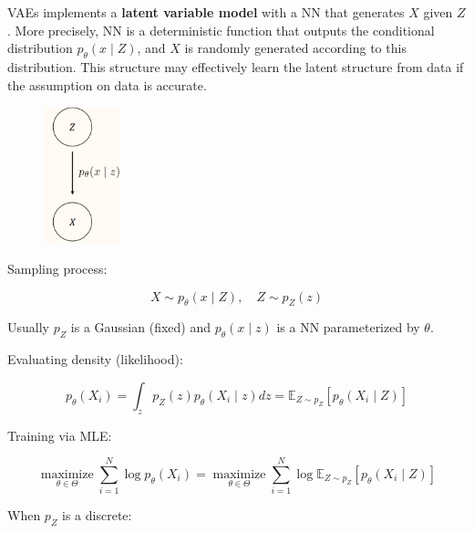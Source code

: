 \documentclass{report}
\begin{document}
\begin{definition}
    VAEs implements a \textbf{latent variable model} with a NN that generates $X$ given $Z$. More precisely, NN is a deterministic function that outputs the conditional distribution $p_{\theta}(x \mid Z)$, and $X$ is randomly generated according to this distribution. This structure may effectively learn the latent structure from data if the assumption on data is accurate.

    \par\noindent\textcolor{gray}{\hdashrule{\textwidth}{0.4pt}{1pt 2pt}}

    \begin{figure}[H]
        \centering
        \includegraphics[width=0.2\textwidth]{.././assets/11.2.png}
    \end{figure}

    Sampling process:

    $$
    X \sim p_{\theta}(x \mid Z), \quad Z \sim p_{Z}(z)
    $$

    Usually $p_{Z}$ is a Gaussian (fixed) and $p_{\theta}(x \mid z)$ is a NN parameterized by $\theta$.

    Evaluating density (likelihood):

    $$
    p_{\theta}\left(X_{i}\right)=\int_{z} p_{Z}(z) p_{\theta}\left(X_{i} \mid z\right) d z=\mathbb{E}_{Z \sim p_{Z}}\left[p_{\theta}\left(X_{i} \mid Z\right)\right]
    $$

    Training via MLE:

    $$
    \underset{\theta \in \Theta}{\operatorname{maximize}} \sum_{i=1}^{N} \log p_{\theta}\left(X_{i}\right)=\underset{\theta \in \Theta}{\operatorname{maximize}} \sum_{i=1}^{N} \log \mathbb{E}_{Z \sim p_{Z}}\left[p_{\theta}\left(X_{i} \mid Z\right)\right]
    $$

    \par\noindent\textcolor{gray}{\hdashrule{\textwidth}{0.4pt}{1pt 2pt}}

    When $p_{Z}$ is a discrete:


\end{definition}
\end{document}
